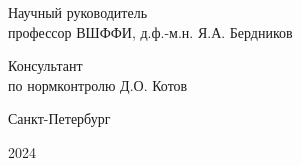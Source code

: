 \begin{titlepage}
\begin{spacing}{1}
\begin{flushleft}
	
	Научный руководитель\\
	профессор ВШФФИ, д.ф.-м.н.
	\hspace{0.1 cm} \hspace{1.8 cm} 
	\hfill  {Я.А. Бердников}
	\vspace{0.5cm}
	
	Консультант \\
	по нормконтролю \hspace{2.1 cm} \hspace{2 cm} \hfill  {Д.О. Котов}
\end{flushleft}


\begin{center}
	Санкт-Петербург
\end{center}
\begin{center}
    2024
\end{center}
\end{spacing}

\end{titlepage}	
